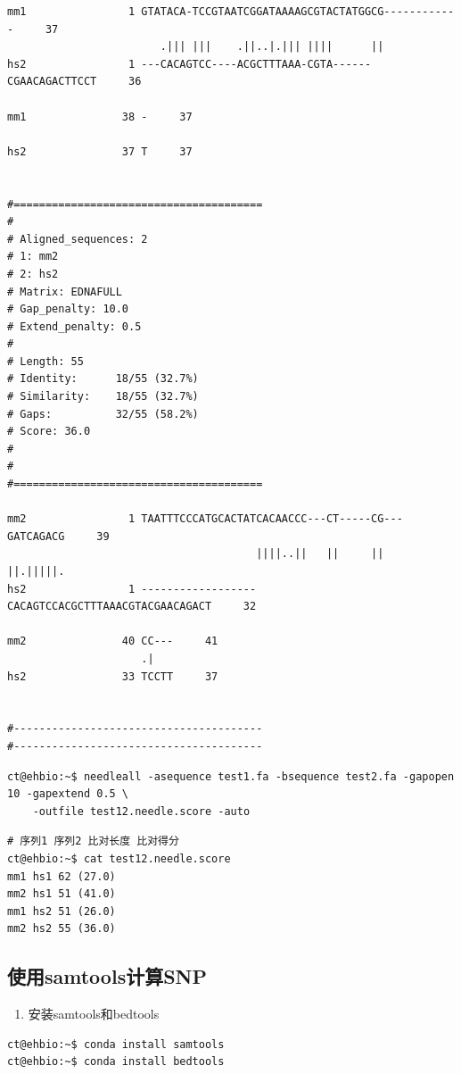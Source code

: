 \documentclass[]{article}
\providecommand{\tightlist}{%
  \setlength{\itemsep}{0pt}\setlength{\parskip}{0pt}}
\numberwithin{figure}{section}
\numberwithin{table}{section}
\begin{document}
\begin{verbatim}
mm1                1 GTATACA-TCCGTAATCGGATAAAAGCGTACTATGGCG------------     37
                        .||| |||    .||..|.||| ||||      ||            
hs2                1 ---CACAGTCC----ACGCTTTAAA-CGTA------CGAACAGACTTCCT     36

mm1               38 -     37
                      
hs2               37 T     37


#=======================================
#
# Aligned_sequences: 2
# 1: mm2
# 2: hs2
# Matrix: EDNAFULL
# Gap_penalty: 10.0
# Extend_penalty: 0.5
#
# Length: 55
# Identity:      18/55 (32.7%)
# Similarity:    18/55 (32.7%)
# Gaps:          32/55 (58.2%)
# Score: 36.0
# 
#
#=======================================

mm2                1 TAATTTCCCATGCACTATCACAACCC---CT-----CG---GATCAGACG     39
                                       ||||..||   ||     ||   ||.|||||.
hs2                1 ------------------CACAGTCCACGCTTTAAACGTACGAACAGACT     32

mm2               40 CC---     41
                     .|   
hs2               33 TCCTT     37


#---------------------------------------
#---------------------------------------
\end{verbatim}

\begin{verbatim}
ct@ehbio:~$ needleall -asequence test1.fa -bsequence test2.fa -gapopen 10 -gapextend 0.5 \
	-outfile test12.needle.score -auto
\end{verbatim}

\begin{verbatim}
# 序列1 序列2 比对长度 比对得分
ct@ehbio:~$ cat test12.needle.score
mm1 hs1 62 (27.0)
mm2 hs1 51 (41.0)
mm1 hs2 51 (26.0)
mm2 hs2 55 (36.0)
\end{verbatim}

\hypertarget{samtools_snp}{%
\subsection{使用samtools计算SNP}\label{samtools_snp}}

\begin{enumerate}
\def\labelenumi{\arabic{enumi}.}
\tightlist
\item
  安装samtools和bedtools
\end{enumerate}

\begin{verbatim}
ct@ehbio:~$ conda install samtools
ct@ehbio:~$ conda install bedtools
\end{verbatim}
\end{document}
